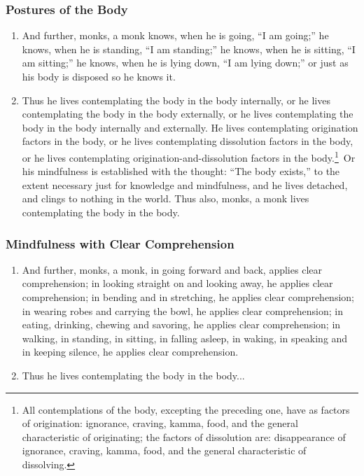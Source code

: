\subsubsection*{Postures of the Body}
\begin{enumerate}[resume]
\item And further, monks, a monk knows, when he is going, “I am going;” he knows, when he is standing, “I am standing;” he knows, when he is sitting, “I am sitting;” he knows, when he is lying down, “I am lying down;” or just as his body is disposed so he knows it.
\pagebreak
\item Thus he lives contemplating the body in the body internally, or he lives contemplating the body in the body externally, or he lives contemplating the body in the body internally and externally. He lives contemplating origination factors in the body, or he lives contemplating dissolution factors in the body, or he lives contemplating origination-and-dissolution factors in the body.\footnote{All contemplations of the body, excepting the preceding one, have as factors of origination: ignorance, craving, kamma, food, and the general characteristic of originating; the factors of dissolution are: disappearance of ignorance, craving, kamma, food, and the general characteristic of dissolving.} Or his mindfulness is established with the thought: “The body exists,” to the extent necessary just for knowledge and mindfulness, and he lives detached, and clings to nothing in the world. Thus also, monks, a monk lives contemplating the body in the body.
\end{enumerate}
\subsubsection*{Mindfulness with Clear Comprehension}
\begin{enumerate}[resume]
\item And further, monks, a monk, in going forward and back, applies clear comprehension; in looking straight on and looking away, he applies clear comprehension; in bending and in stretching, he applies clear comprehension; in wearing robes and carrying the bowl, he applies clear comprehension; in eating, drinking, chewing and savoring, he applies clear comprehension; in walking, in standing, in sitting, in falling asleep, in waking, in speaking and in keeping silence, he applies clear comprehension.
\item Thus he lives contemplating the body in the body...
\end{enumerate}
